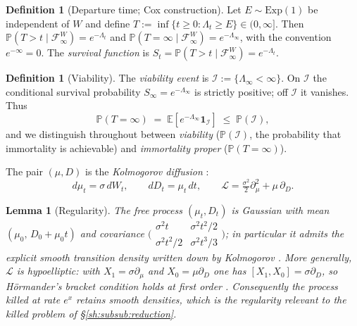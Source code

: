 \documentclass[11pt]{article}
\numberwithin{equation}{section}
\theoremstyle{plain}
\newtheorem{lemma}[theorem]{Lemma}
\theoremstyle{definition}
\newtheorem{definition}[theorem]{Definition}
\theoremstyle{remark}
\newcommand{\E}{\mathbb{E}}
\newcommand{\PP}{\mathbb{P}}
\newcommand{\one}{\mathbf{1}}
\newcommand{\Imm}{\mathcal{I}}
\newcommand{\Fc}{\mathcal{F}}
\newcommand{\Lc}{\mathcal{L}}
\begin{document}
\begin{definition}[Departure time; Cox construction]\label{sh:def:cox}
Let $E\sim\mathrm{Exp}(1)$ be independent of $W$ and define
$T:=\inf\{t\ge0:\Lambda_t\ge E\}\in(0,\infty]$. Then
$\PP(T>t\mid\Fc^W_\infty)=e^{-\Lambda_t}$ and
$\PP(T=\infty\mid\Fc^W_\infty)=e^{-\Lambda_\infty}$, with the convention
$e^{-\infty}=0$. The \emph{survival function} is
$S_t=\PP(T>t\mid\Fc^W_\infty)=e^{-\Lambda_t}$.
\end{definition}

\begin{definition}[Viability]\label{sh:def:viab}
The \emph{viability event} is $\Imm:=\{\Lambda_\infty<\infty\}$. On $\Imm$
the conditional survival probability $S_\infty=e^{-\Lambda_\infty}$ is
strictly positive; off $\Imm$ it vanishes. Thus
\begin{equation}\label{sh:eq:twotier}
\PP(T=\infty)\;=\;\E\!\left[e^{-\Lambda_\infty}\one_\Imm\right]
\;\le\;\PP(\Imm),
\end{equation}
and we distinguish throughout between \emph{viability} ($\PP(\Imm)$, the
probability that immortality is achievable) and \emph{immortality proper}
($\PP(T=\infty)$).
\end{definition}

The pair $(\mu,D)$ is the \emph{Kolmogorov diffusion} \cite{Kol34}:
\begin{equation}\label{sh:eq:kolm}
d\mu_t=\sigma\,dW_t,\qquad dD_t=\mu_t\,dt,\qquad
\Lc=\tfrac{\sigma^2}{2}\partial_\mu^2+\mu\,\partial_D .
\end{equation}

\begin{lemma}[Regularity]\label{sh:lem:hypo}
The free process $(\mu_t,D_t)$ is Gaussian with mean
$(\mu_0,\,D_0+\mu_0t)$ and covariance
$\bigl(\begin{smallmatrix}\sigma^2t&\sigma^2t^2/2\\
\sigma^2t^2/2&\sigma^2t^3/3\end{smallmatrix}\bigr)$;
in particular it admits the explicit smooth transition density written down
by Kolmogorov \cite{Kol34}. More generally, $\Lc$ is hypoelliptic: with
$X_1=\sigma\partial_\mu$ and $X_0=\mu\partial_D$ one has
$[X_1,X_0]=\sigma\partial_D$, so H\"ormander's bracket condition holds at
first order \cite{Hor67}. Consequently the process killed at rate $e^{x}$
retains smooth densities, which is the regularity relevant to the killed
problem of \S\ref{sh:subsub:reduction}.
\end{lemma}
\end{document}
